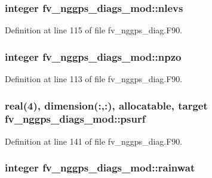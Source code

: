 \subsubsection[{nlevs}]{\setlength{\rightskip}{0pt plus 5cm}integer fv\-\_\-nggps\-\_\-diags\-\_\-mod\-::nlevs\hspace{0.3cm}{\ttfamily [private]}}\label{classfv__nggps__diags__mod_a45187525edfc30bf711eeb0bb8efb040}


Definition at line 115 of file fv\-\_\-nggps\-\_\-diag.\-F90.

\subsubsection[{npzo}]{\setlength{\rightskip}{0pt plus 5cm}integer fv\-\_\-nggps\-\_\-diags\-\_\-mod\-::npzo\hspace{0.3cm}{\ttfamily [private]}}\label{classfv__nggps__diags__mod_a34ced43246de58031ac0f5bc43d7f043}


Definition at line 113 of file fv\-\_\-nggps\-\_\-diag.\-F90.

\subsubsection[{psurf}]{\setlength{\rightskip}{0pt plus 5cm}real(4), dimension(\-:,\-:), allocatable, target fv\-\_\-nggps\-\_\-diags\-\_\-mod\-::psurf\hspace{0.3cm}{\ttfamily [private]}}\label{classfv__nggps__diags__mod_af7f5be1d89289b4cf2b12c6b11fad16a}


Definition at line 141 of file fv\-\_\-nggps\-\_\-diag.\-F90.

\subsubsection[{rainwat}]{\setlength{\rightskip}{0pt plus 5cm}integer fv\-\_\-nggps\-\_\-diags\-\_\-mod\-::rainwat\hspace{0.3cm}{\ttfamily [private]}}\label{classfv__nggps__diags__mod_adc96217bcb04e9c325be22b533ad6fda}


